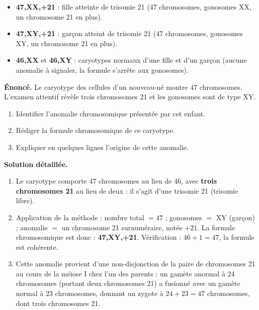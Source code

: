 \documentclass[11pt]{article}
\newcommand{\cle}[1]{{\popxbold\color{popdark}#1}}
\begin{document}
\begin{exemplebox}
\begin{itemize}
\item \textbf{47,XX,+21} : fille atteinte de trisomie 21 (47 chromosomes, gonosomes XX, un chromosome 21 en plus).
\item \textbf{47,XY,+21} : garçon atteint de trisomie 21 (47 chromosomes, gonosomes XY, un chromosome 21 en plus).
\item \textbf{46,XX} et \textbf{46,XY} : caryotypes normaux d'une fille et d'un garçon (aucune anomalie à signaler, la formule s'arrête aux gonosomes).
\end{itemize}
\end{exemplebox}

\begin{exoresolu}
\textbf{Énoncé.} Le caryotype des cellules d'un nouveau-né montre 47 chromosomes. L'examen attentif révèle trois chromosomes 21 et les gonosomes sont de type XY.
\begin{enumerate}
\item Identifier l'anomalie chromosomique présentée par cet enfant.
\item Rédiger la formule chromosomique de ce caryotype.
\item Expliquer en quelques lignes l'origine de cette anomalie.
\end{enumerate}
\tcblower
\textbf{Solution détaillée.}
\begin{enumerate}
\item Le caryotype comporte 47 chromosomes au lieu de 46, avec \textbf{trois chromosomes 21} au lieu de deux : il s'agit d'une \cle{trisomie 21} (trisomie libre).
\item Application de la méthode : nombre total $= 47$ ; gonosomes $=$ XY (garçon) ; anomalie $=$ un chromosome 21 surnuméraire, notée $+21$. La formule chromosomique est donc : \textbf{47,XY,+21}. Vérification : $46 + 1 = 47$, la formule est cohérente.
\item Cette anomalie provient d'une \cle{non-disjonction} de la paire de chromosomes 21 au cours de la méiose I chez l'un des parents : un gamète anormal à 24 chromosomes (portant deux chromosomes 21) a fusionné avec un gamète normal à 23 chromosomes, donnant un zygote à $24 + 23 = 47$ chromosomes, dont trois chromosomes 21.
\end{enumerate}
\end{exoresolu}
\end{document}
